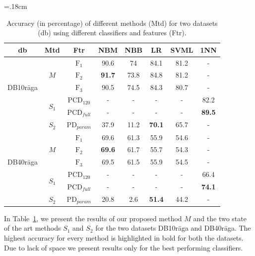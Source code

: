 \begin{table}
	\tabcolsep=.18cm
	\centering
	\begin{tabular}{c|c|c|c c c c c}
		\hline
		db & Mtd & Ftr & NBM & NBB & LR & SVML & 1NN\tabularnewline
		\hline \hline 
		\multirow{5}{*}{\begin{turn}{90}DB10r\={a}ga\end{turn}} & \multirow{3}{*}{$M$} & $\mathrm{F_1}$ & 90.6 & 74 & 84.1 & 81.2 & -\tabularnewline
		
		&  & $\mathrm{F_2}$ & {\bf 91.7} & 73.8 & 84.8 & 81.2 & -\tabularnewline
		
		&  & $\mathrm{F_3}$ & 90.5 & 74.5 & 84.3 & 80.7 & -\tabularnewline
		\cline{2-8} 
		& \multirow{2}{*}{$S_1$} & $\mathrm{PCD}_{120}$ & - & - & - & - & 82.2\tabularnewline
		& & $\mathrm{PCD}_{full}$ & - & - & - & - & {\bf 89.5}\tabularnewline
		\cline{2-8} 
		& $S_2$ & $\mathrm{PD}_{param}$ & 37.9 & 11.2 & {\bf 70.1} & 65.7 & -\tabularnewline
		\hline \hline
		\multirow{5}{*}{\begin{turn}{90}DB40r\={a}ga\end{turn}} & \multirow{3}{*}{$M$} & $\mathrm{F_1}$ & 69.6 & 61.3 & 55.9 & 54.6 & -\tabularnewline
		
		&  & $\mathrm{F_2}$ & {\bf 69.6} & 61.7 & 55.7 & 54.3 & -\tabularnewline
		
		&  & $\mathrm{F_3}$ & 69.5 & 61.5 & 55.9 & 54.5 & -\tabularnewline
		\cline{2-8} 
		& \multirow{2}{*}{$S_1$} & $\mathrm{PCD}_{120}$ & - & - & - & - & 66.4\tabularnewline
		
		& & $\mathrm{PCD}_{full}$ & - & - & - & - & {\bf 74.1}\tabularnewline
		\cline{2-8} 
		& $S_2$ & $\mathrm{PD}_{param}$ & 20.8 & 2.6 & {\bf 51.4} & 44.2 & -\tabularnewline
		\hline \hline
	\end{tabular}
	
	\caption{Accuracy (in percentage) of different methods (Mtd) for two datasets (db) using different classifiers and features (Ftr).} 
	\label{tab:accuracies_for_variants}
\end{table}



In Table~\ref{tab:accuracies_for_variants}, we present the results of our proposed method $M$ and the two state of the art methods $S_1$ and $S_2$ for the two datasets DB10r\={a}ga and DB40r\={a}ga. The highest accuracy for every method is highlighted in bold for both the datasets. Due to lack of space we present results only for the best performing classifiers. 

